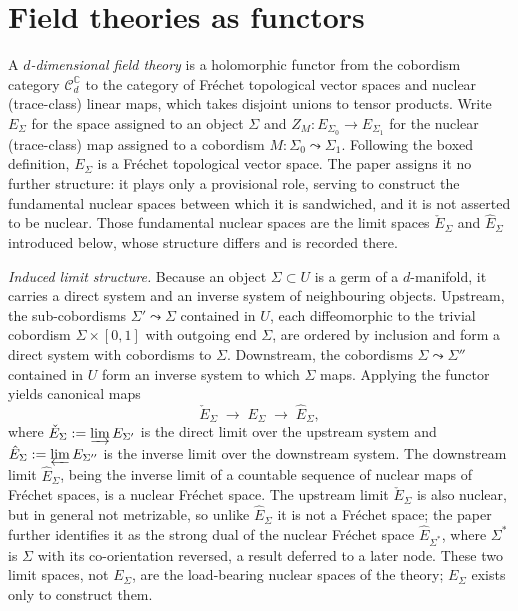 \section{Field theories as functors}

\begin{definition}
  \label{def:field-theory}
  \notready
  A \emph{$d$-dimensional field theory} is a holomorphic functor from the
  cobordism category $\mathcal C_d^{\mathbb C}$ to the category of Fréchet
  topological vector spaces and nuclear (trace-class) linear maps, which takes
  disjoint unions to tensor products. Write $E_{\Sigma}$ for the space assigned to an object $\Sigma$ and
  $Z_M \colon E_{\Sigma_0} \to E_{\Sigma_1}$ for the nuclear (trace-class) map
  assigned to a cobordism $M \colon \Sigma_0 \leadsto \Sigma_1$. Following the
  boxed definition, $E_{\Sigma}$ is a Fréchet topological vector space. The
  paper assigns it no further structure: it plays only a provisional role,
  serving to construct the fundamental nuclear spaces between which it is
  sandwiched, and it is not asserted to be nuclear. Those fundamental nuclear
  spaces are the limit spaces $\check E_{\Sigma}$ and $\hat E_{\Sigma}$
  introduced below, whose structure differs and is recorded there.

  \emph{Induced limit structure.} Because an object $\Sigma \subset U$ is a germ
  of a $d$-manifold, it carries a direct system and an inverse system of
  neighbouring objects. Upstream, the sub-cobordisms $\Sigma' \leadsto \Sigma$
  contained in $U$, each diffeomorphic to the trivial cobordism
  $\Sigma \times [0,1]$ with outgoing end $\Sigma$, are ordered by inclusion and
  form a direct system with cobordisms to $\Sigma$. Downstream, the cobordisms
  $\Sigma \leadsto \Sigma''$ contained in $U$ form an inverse system to which
  $\Sigma$ maps. Applying the functor yields canonical maps
  \[
    \check E_{\Sigma} \;\longrightarrow\; E_{\Sigma} \;\longrightarrow\;
    \hat E_{\Sigma},
  \]
  where $\check E_{\Sigma} := \varinjlim E_{\Sigma'}$ is the direct limit over
  the upstream system and $\hat E_{\Sigma} := \varprojlim E_{\Sigma''}$ is the
  inverse limit over the downstream system. The downstream limit
  $\hat E_{\Sigma}$, being the inverse limit of a countable sequence of nuclear
  maps of Fréchet spaces, is a nuclear Fréchet space. The upstream limit
  $\check E_{\Sigma}$ is also nuclear, but in general not metrizable, so unlike
  $\hat E_{\Sigma}$ it is not a Fréchet space; the paper further identifies it as
  the strong dual of the nuclear Fréchet space $\hat E_{\Sigma^*}$, where
  $\Sigma^*$ is $\Sigma$ with its co-orientation reversed, a result deferred to a
  later node. These two limit spaces, not $E_{\Sigma}$, are the load-bearing
  nuclear spaces of the theory; $E_{\Sigma}$ exists only to construct them.


\end{definition}
